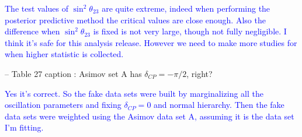 \documentclass[final]{elsarticle}
\begin{document}
\textcolor{blue}{The test values of $\sin^2 \theta_{23}$ are quite extreme, indeed 
when performing the posterior predictive method the critical values are close enough.
Also the difference when $\sin^2 \theta_{23}$ is fixed is not very large, though not fully negligible.
I think it's safe for this analysis release. However we need to make more studies for when 
higher statistic is collected.}

-- Table 27 caption : Asimov set A has $\delta_{CP} = -\pi/2$, right?

\textcolor{blue}{Yes it's correct. So the fake data sets were built by marginalizing all the oscillation parameters
and fixing $\delta_{CP}=0$ and normal hierarchy.
Then the fake data sets were weighted using the Asimov data set A, assuming it is the data set I'm fitting.}
\end{document}
